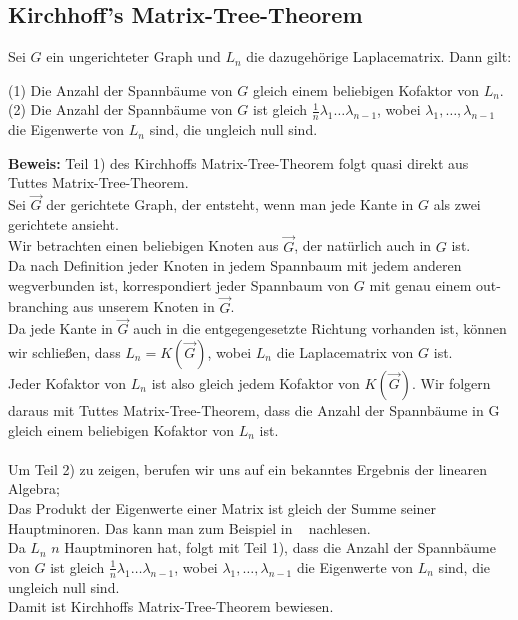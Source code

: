 \graphicspath{{grafiken/}}

\subsection{Kirchhoff's Matrix-Tree-Theorem}
\begin{Tms}
Sei $G$ ein ungerichteter Graph und $L_n$  die dazugehörige Laplacematrix. 
Dann gilt:
\par
\begingroup
\leftskip=20pt%
\rightskip=20pt
\noindent %
(1) Die Anzahl der Spannbäume von $G$ gleich einem beliebigen Kofaktor von $L_n$.\\
(2) Die Anzahl der Spannbäume von $G$ ist gleich $\frac{1}{n}\lambda_1\ldots\lambda_{n-1}$, wobei $\lambda_1,\ldots,\lambda_{n-1}$ die Eigenwerte von $L_n$ sind, die ungleich null sind.
\par
\endgroup
\end{Tms}

\textbf{Beweis:}
Teil 1) des Kirchhoffs Matrix-Tree-Theorem folgt quasi direkt aus Tuttes Matrix-Tree-Theorem. \\
Sei $\vec{G}$ der gerichtete Graph, der entsteht, wenn man jede Kante in $G$ als zwei gerichtete ansieht.\\
Wir betrachten einen beliebigen Knoten aus $\vec{G}$, der natürlich auch in $G$ ist. \\
Da nach Definition jeder Knoten in jedem Spannbaum mit jedem anderen wegverbunden ist, korrespondiert jeder Spannbaum von $G$ mit genau einem out-branching aus unserem Knoten in $\vec{G}$. \\
Da jede Kante in $\vec{G}$ auch in die entgegengesetzte Richtung vorhanden ist, können wir schließen, dass $L_n=K(\vec{G})$, wobei $L_n$ die Laplacematrix von $G$ ist. \\
Jeder Kofaktor von $L_n$ ist also gleich jedem Kofaktor von $K(\vec{G})$.
Wir folgern daraus mit Tuttes Matrix-Tree-Theorem, dass die Anzahl der Spannbäume in G gleich einem beliebigen Kofaktor von $L_n$ ist.\\ \\
Um Teil 2) zu zeigen, berufen wir uns auf ein bekanntes Ergebnis der linearen Algebra; \\
Das Produkt der Eigenwerte einer Matrix ist gleich der Summe seiner Hauptminoren. Das kann man zum Beispiel in ~\cite{meyer_2005} nachlesen. \\
Da $L_n$ $n$ Hauptminoren hat, folgt mit Teil 1), dass die Anzahl der Spannbäume von $G$ ist gleich $\frac{1}{n}\lambda_1\ldots\lambda_{n-1}$, wobei $\lambda_1,\ldots,\lambda_{n-1}$ die Eigenwerte von $L_n$ sind, die ungleich null sind. \\
Damit ist Kirchhoffs Matrix-Tree-Theorem bewiesen.
 
